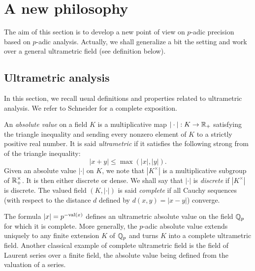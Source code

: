\documentclass{amsart}
\begin{document}

\section{A new philosophy}
\label{sec:philosophy}

The aim of this section is to develop a new point of view on $p$-adic 
precision based on $p$-adic analysis. Actually, we shall generalize a 
bit the setting and work over a general ultrametric field (see definition
below).

\subsection{Ultrametric analysis}
\label{ssec:ultrametric}

In this section, we recall usual definitions and properties related to
ultrametric analysis. We refer to Schneider \cite{Schneider} for a 
complete exposition.

An \emph{absolute value} on a field $K$ is a multiplicative map $|\cdot| 
: K \to \mathbb R_+$ satisfying the triangle inequality and sending every 
nonzero element of $K$ to a strictly positive real number. It is said 
\emph{ultrametric} if it satisfies the following strong from of the 
triangle inequality:
$$|x+y| \leq \max(|x|, |y|).$$
Given an absolute value $|\cdot|$ on $K$, we note that $|K^\times|$ is a 
multiplicative subgroup of $\mathbb R_+^\times$. It is then either discrete or 
dense. We shall say that $|\cdot|$ is \emph{discrete} if $|K^\times|$ is
discrete. The valued field $(K, |\cdot|)$ is said \emph{complete} if all 
Cauchy sequences (with respect to the distance $d$ defined by $d(x,y) = 
|x-y|$) converge.

The formula $|x| = p^{-\text{\rm val}(x)}$ defines an ultrametric absolute value on 
the field $\mathbb Q_p$ for which it is complete. More generally, the $p$-adic 
absolute value extends uniquely to any finite extension $K$ of $\mathbb Q_p$ and 
turns $K$ into a complete ultrametric field. Another classical example of 
complete ultrametric field is the field of Laurent series over a finite
field, the absolute value being defined from the valuation of a series.
\end{document}
